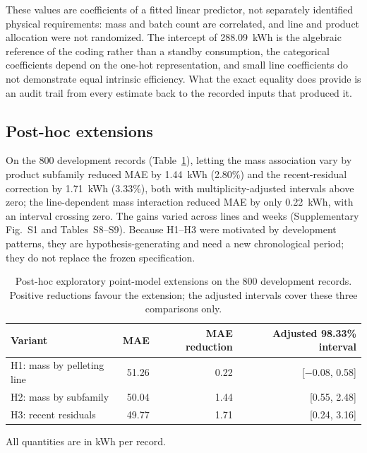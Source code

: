 These values are coefficients of a fitted linear predictor, not separately identified physical requirements: mass and batch count are correlated, and line and product allocation were not randomized. The intercept of 288.09~kWh is the algebraic reference of the coding rather than a standby consumption, the categorical coefficients depend on the one-hot representation, and small line coefficients do not demonstrate equal intrinsic efficiency. What the exact equality does provide is an audit trail from every estimate back to the recorded inputs that produced it.

\FloatBarrier
\subsection{Post-hoc extensions}
On the 800 development records (Table~\ref{tab:explore}), letting the mass association vary by product subfamily reduced MAE by 1.44~kWh (2.80\%) and the recent-residual correction by 1.71~kWh (3.33\%), both with multiplicity-adjusted intervals above zero; the line-dependent mass interaction reduced MAE by only 0.22~kWh, with an interval crossing zero. The gains varied across lines and weeks (Supplementary Fig.~S1 and Tables~S8--S9). Because H1--H3 were motivated by development patterns, they are hypothesis-generating and need a new chronological period; they do not replace the frozen specification.

\begin{table}[!htbp]\centering\small\setlength{\tabcolsep}{4pt}
\caption{Post-hoc exploratory point-model extensions on the 800 development records. Positive reductions favour the extension; the adjusted intervals cover these three comparisons only.}\label{tab:explore}
\begin{tabular}{@{}lrrr@{}}\toprule
Variant & MAE & MAE reduction & Adjusted 98.33\% interval \\\midrule
H1: mass by pelleting line & 51.26 & 0.22 & [$-0.08$, 0.58] \\
H2: mass by subfamily & 50.04 & 1.44 & [0.55, 2.48] \\
H3: recent residuals & 49.77 & 1.71 & [0.24, 3.16] \\\bottomrule
\end{tabular}\par\vspace{4pt}\footnotesize All quantities are in kWh per record.
\end{table}

